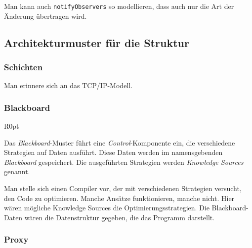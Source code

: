 \documentclass{panikzettel}
\begin{document}
Man kann auch \lstinline{notifyObservers} so modellieren, dass auch nur die Art der Änderung übertragen wird.

\subsection{Architekturmuster für die Struktur}

\subsubsection{Schichten}

Man erinnere sich an das TCP/IP-Modell.

\subsubsection{Blackboard}

\begin{wrapfigure}[15]{R}{0pt}
\end{wrapfigure}

Das \emph{Blackboard}-Muster führt eine \emph{Control}-Komponente ein, die verschiedene Strategien auf Daten ausführt.
Diese Daten werden im namensgebenden \emph{Blackboard} gespeichert.
Die ausgeführten Strategien werden \emph{Knowledge Sources} genannt.

Man stelle sich einen Compiler vor, der mit verschiedenen Strategien versucht, den Code zu optimieren.
Manche Ansätze funktionieren, manche nicht.
Hier wären mögliche Knowledge Sources die Optimierungsstrategien.
Die Blackboard-Daten wären die Datenstruktur gegeben, die das Programm darstellt.


\subsubsection{Proxy}
\end{document}
